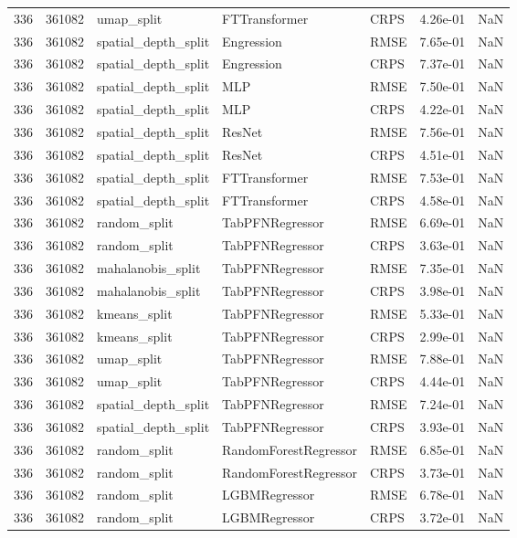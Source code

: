 \begin{tabular}{rrlllrr}
336 & 361082 & umap\_split & FTTransformer & CRPS & 4.26e-01 & NaN \\
336 & 361082 & spatial\_depth\_split & Engression & RMSE & 7.65e-01 & NaN \\
336 & 361082 & spatial\_depth\_split & Engression & CRPS & 7.37e-01 & NaN \\
336 & 361082 & spatial\_depth\_split & MLP & RMSE & 7.50e-01 & NaN \\
336 & 361082 & spatial\_depth\_split & MLP & CRPS & 4.22e-01 & NaN \\
336 & 361082 & spatial\_depth\_split & ResNet & RMSE & 7.56e-01 & NaN \\
336 & 361082 & spatial\_depth\_split & ResNet & CRPS & 4.51e-01 & NaN \\
336 & 361082 & spatial\_depth\_split & FTTransformer & RMSE & 7.53e-01 & NaN \\
336 & 361082 & spatial\_depth\_split & FTTransformer & CRPS & 4.58e-01 & NaN \\
336 & 361082 & random\_split & TabPFNRegressor & RMSE & 6.69e-01 & NaN \\
336 & 361082 & random\_split & TabPFNRegressor & CRPS & 3.63e-01 & NaN \\
336 & 361082 & mahalanobis\_split & TabPFNRegressor & RMSE & 7.35e-01 & NaN \\
336 & 361082 & mahalanobis\_split & TabPFNRegressor & CRPS & 3.98e-01 & NaN \\
336 & 361082 & kmeans\_split & TabPFNRegressor & RMSE & 5.33e-01 & NaN \\
336 & 361082 & kmeans\_split & TabPFNRegressor & CRPS & 2.99e-01 & NaN \\
336 & 361082 & umap\_split & TabPFNRegressor & RMSE & 7.88e-01 & NaN \\
336 & 361082 & umap\_split & TabPFNRegressor & CRPS & 4.44e-01 & NaN \\
336 & 361082 & spatial\_depth\_split & TabPFNRegressor & RMSE & 7.24e-01 & NaN \\
336 & 361082 & spatial\_depth\_split & TabPFNRegressor & CRPS & 3.93e-01 & NaN \\
336 & 361082 & random\_split & RandomForestRegressor & RMSE & 6.85e-01 & NaN \\
336 & 361082 & random\_split & RandomForestRegressor & CRPS & 3.73e-01 & NaN \\
336 & 361082 & random\_split & LGBMRegressor & RMSE & 6.78e-01 & NaN \\
336 & 361082 & random\_split & LGBMRegressor & CRPS & 3.72e-01 & NaN \\

\end{tabular}

